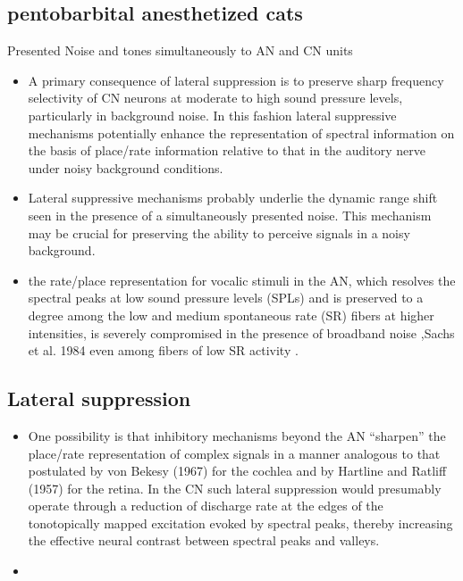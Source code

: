 \documentclass[10pt,a4paper]{article}
\begin{document}
\subsection{\citep{RhodeGreenberg:1994b} pentobarbital anesthetized cats}

Presented Noise and tones simultaneously to AN and CN units


\begin{itemize}
\item A primary consequence of lateral suppression is to preserve sharp
  frequency selectivity of CN neurons at moderate to high sound pressure levels,
  particularly in background noise. In this fashion lateral suppressive
  mechanisms potentially enhance the representation of spectral information on
  the basis of place/rate information relative to that in the auditory nerve
  under noisy background conditions.
\item Lateral suppressive mechanisms probably underlie the dynamic range shift
  seen in the presence of a simultaneously presented noise. This mechanism may
  be crucial for preserving the ability to perceive signals in a noisy
  background.
\item the rate/place representation for vocalic stimuli in the AN, which
  resolves the spectral peaks at low sound pressure levels (SPLs) and is
  preserved to a degree among the low and medium spontaneous rate (SR) fibers at
  higher intensities, is severely compromised in the presence of broadband noise
  \citep{GeislerGamble:1989} ,Sachs et al. 1984 even among fibers of low SR
  activity \citep{SachsVoigtEtAl:1983,MillerSachs:1984,SilkesGeisler:1991}.
\end{itemize}

\subsection{Lateral suppression}


\begin{itemize}
\item One possibility is that inhibitory mechanisms beyond the AN
  {\textquotedblleft}sharpen{\textquotedblright} the place/rate representation
  of complex signals in a manner analogous to that postulated by von Bekesy
  (1967) for the cochlea and by Hartline and Ratliff (1957) for the retina. In
  the CN such lateral suppression would presumably operate through a reduction
  of discharge rate at the edges of the tonotopically mapped excitation evoked
  by spectral peaks, thereby increasing the effective neural contrast between
  spectral peaks and valleys.
\item \end{itemize}
\end{document}
